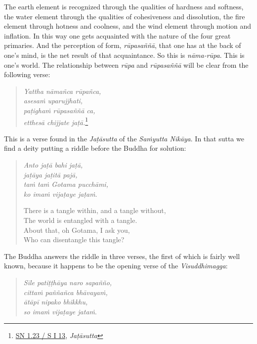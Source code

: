 The earth element is recognized through the qualities of hardness and softness, the water element through the qualities of cohesiveness and dissolution, the fire element through hotness and coolness, and the wind element through motion and inflation. In this way one gets acquainted with the nature of the four great primaries. And the perception of form, \emph{rūpasaññā}, that one has at the back of one's mind, is the net result of that acquaintance. So this is \emph{nāma-rūpa}. This is one's world. The relationship between \emph{rūpa} and \emph{rūpasaññā} will be clear from the following verse:

\begin{quote}
\emph{Yattha nāmañca rūpañca,}\\
\emph{asesaṁ uparujjhati,}\\
\emph{paṭighaṁ rūpasaññā ca,}\\
\emph{etthesā chijjate jaṭā.}\footnote{\href{https://suttacentral.net/sn1.23/pli/ms}{SN 1.23 / S I 13}, \emph{Jaṭāsutta}}
\end{quote}

This is a verse found in the \emph{Jaṭāsutta} of the \emph{Saṁyutta Nikāya}. In that sutta we find a deity putting a riddle before the Buddha for solution:

\begin{quote}
\emph{Anto jaṭā bahi jaṭā,}\\
\emph{jaṭāya jaṭitā pajā,}\\
\emph{taṁ taṁ Gotama pucchāmi,}\\
\emph{ko imaṁ vijaṭaye jaṭaṁ}.

There is a tangle within, and a tangle without,\\
The world is entangled with a tangle.\\
About that, oh Gotama, I ask you,\\
Who can disentangle this tangle?
\end{quote}

The Buddha answers the riddle in three verses, the first of which is fairly well known, because it happens to be the opening verse of the \emph{Visuddhimagga}:

\begin{quote}
\emph{Sīle patiṭṭhāya naro sapañño,}\\
\emph{cittaṁ paññañca bhāvayaṁ,}\\
\emph{ātāpī nipako bhikkhu,}\\
\emph{so imaṁ vijaṭaye jataṁ}.
\end{quote}

